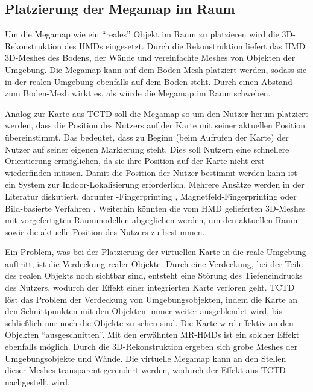 \subsection{Platzierung der Megamap im Raum}
Um die Megamap wie ein \enquote{reales} Objekt im Raum zu platzieren wird die 3D-Rekonstruktion des HMDs eingesetzt.
Durch die Rekonstruktion liefert das HMD 3D-Meshes des Bodens, der Wände und vereinfachte Meshes von Objekten der Umgebung.
Die Megamap kann auf dem Boden-Mesh platziert werden, sodass sie in der realen Umgebung ebenfalls auf dem Boden steht.
Durch einen Abstand zum Boden-Mesh wirkt es, als würde die Megamap im Raum schweben.

Analog zur Karte aus TCTD soll die Megamap so um den Nutzer herum platziert werden, dass die Position des Nutzers auf der Karte mit seiner aktuellen Position übereinstimmt.
Das bedeutet, dass zu Beginn (beim Aufrufen der Karte) der Nutzer auf seiner eigenen Markierung steht.
Dies soll Nutzern eine schnellere Orientierung ermöglichen, da sie ihre Position auf der Karte nicht erst wiederfinden müssen.
Damit die Position der Nutzer bestimmt werden kann ist ein System zur Indoor-Lokalisierung erforderlich.
Mehrere Ansätze werden in der Literatur diskutiert, darunter \wifi-Fingerprinting \parencites{Lautenschlaeger2012}{Alnabhan2014}, Magnetfeld-Fingerprinting \parencites{Hashish2017}{Ang2018} oder Bild-basierte Verfahren \parencites{Kalkusch2002}{Moeller2014}{Silva2015}.
Weiterhin könnten die vom HMD gelieferten 3D-Meshes mit vorgefertigten Raummodellen abgeglichen werden, um den aktuellen Raum sowie die aktuelle Position des Nutzers zu bestimmen.

Ein Problem, was bei der Platzierung der virtuellen Karte in die reale Umgebung auftritt, ist die Verdeckung realer Objekte.
Durch eine Verdeckung, bei der Teile des realen Objekts noch sichtbar sind, entsteht eine Störung des Tiefeneindrucks des Nutzers, wodurch der Effekt einer integrierten Karte verloren geht.
TCTD löst das Problem der Verdeckung von Umgebungsobjekten, indem die Karte an den Schnittpunkten mit den Objekten immer weiter ausgeblendet wird, bis schließlich nur noch die Objekte zu sehen sind.
Die Karte wird effektiv an den Objekten \enquote{ausgeschnitten}.
Mit den erwähnten MR-HMDs ist ein solcher Effekt ebenfalls möglich.
Durch die 3D-Rekonstruktion ergeben sich grobe Meshes der Umgebungsobjekte und Wände.
Die virtuelle Megamap kann an den Stellen dieser Meshes transparent gerendert werden, wodurch der Effekt aus TCTD nachgestellt wird.

